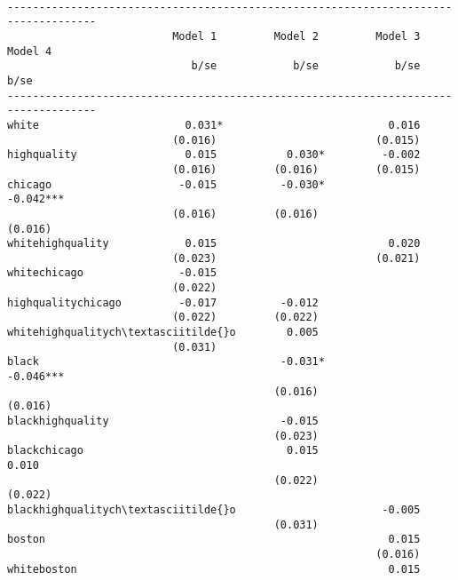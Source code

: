 \documentclass[11pt]{article}
\begin{document}
    \begin{Verbatim}[commandchars=\\\{\}]

------------------------------------------------------------------------------------
                          Model 1         Model 2         Model 3         Model 4   
                             b/se            b/se            b/se            b/se   
------------------------------------------------------------------------------------
white                       0.031*                          0.016                   
                          (0.016)                         (0.015)                   
highquality                 0.015           0.030*         -0.002                   
                          (0.016)         (0.016)         (0.015)                   
chicago                    -0.015          -0.030*                         -0.042***
                          (0.016)         (0.016)                         (0.016)   
whitehighquality            0.015                           0.020                   
                          (0.023)                         (0.021)                   
whitechicago               -0.015                                                   
                          (0.022)                                                   
highqualitychicago         -0.017          -0.012                                   
                          (0.022)         (0.022)                                   
whitehighqualitych\textasciitilde{}o        0.005                                                   
                          (0.031)                                                   
black                                      -0.031*                         -0.046***
                                          (0.016)                         (0.016)   
blackhighquality                           -0.015                                   
                                          (0.023)                                   
blackchicago                                0.015                           0.010   
                                          (0.022)                         (0.022)   
blackhighqualitych\textasciitilde{}o                       -0.005                                   
                                          (0.031)                                   
boston                                                      0.015                   
                                                          (0.016)                   
whiteboston                                                 0.015                   

\end{Verbatim}
\end{document}
